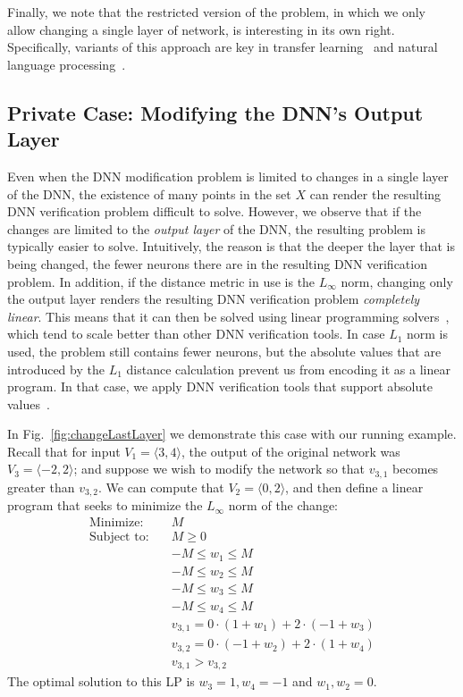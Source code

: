 \documentclass{easychair}
\begin{document}
Finally, we note that the restricted version of the problem, in which
we only allow changing a single layer of network, is interesting in
its own right. Specifically, variants of this approach are key in
transfer learning~\cite{Gi15,GrDoDaMa14,WeVeWa07,YoClBeLi14} and
natural language processing~\cite{DeChLeTo18,PeNeIvGaClLeZe18,SiZi14}.


\subsection{Private Case: Modifying the DNN's Output Layer}
\label{sec:outputLayer}

Even when the DNN modification problem is limited to changes in a
single layer of the DNN, the existence of many points in the set $X$
can render the resulting DNN verification problem difficult to
solve. However,  we observe that if the changes are limited to the \emph{output
  layer} of the DNN, the resulting problem is typically easier to
solve. Intuitively, the reason is that the deeper the layer that is being changed,
the fewer neurons there are in the resulting DNN verification problem.
In addition, if the distance metric in use is the $L_\infty$ norm,
changing only the output layer renders the resulting DNN verification
problem \emph{completely linear}. This means that it can then be solved using
linear programming solvers~\cite{TjXiTe19}, which tend to scale better than other DNN
verification tools. In case $L_1$ norm is used, the problem still
contains fewer neurons, but the absolute values that are introduced by
the $L_1$ distance calculation prevent us from encoding it as a linear
program. In that case, we apply DNN verification tools that support
absolute values~\cite{KaHuIbJuLaLiShThWuZeDiKoBa19Marabou}.

In Fig.~\ref{fig:changeLastLayer} we demonstrate this case with our running example.
Recall that for input $V_1=\langle 3,4\rangle$, the output of the
original network  was $V_3=\langle -2,2 \rangle$; and suppose we wish
to modify the network so that $v_{3,1}$ becomes greater than $v_{3,2}$.
We can compute that $V_2=\langle 0,2\rangle$, and then define a linear
program that seeks to minimize the $L_\infty$ norm of the change:
\begin{align*}
\text{Minimize}:\quad & M \\
  \text{Subject to}:\quad &M\geq 0\\
& -M \leq w_1\leq M \\
& -M \leq w_2\leq M \\
& -M \leq w_3\leq M \\
& -M \leq w_4\leq M \\
& v_{3,1}=0\cdot(1+w_1)+2\cdot(-1+w_3)\\
& v_{3,2}=0\cdot(-1+w_2)+2\cdot(1+w_4)\\
& v_{3,1} > v_{3,2}
\end{align*}
The optimal solution to this LP is $w_3=1,w_4=-1$ and $w_1,w_2=0$. 
\end{document}
